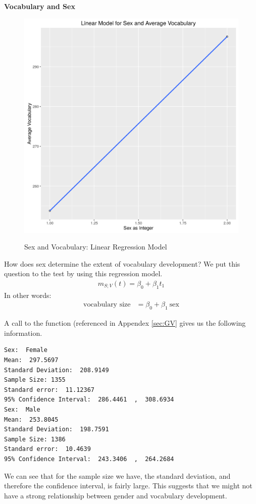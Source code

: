 \documentclass[11pt]{article}  %
\begin{document}
\textbf{Vocabulary and Sex}
\begin{figure}[h]
\centering
\caption{Sex and Vocabulary: Linear Regression Model}
\includegraphics[scale=.50]{means_sex}
\label{sexV}
\end{figure}

How does sex determine the extent of vocabulary development? We put this question to the test by using this regression model.
    \begin{align*}
        m_{S;V}(t) = \beta_0 + \beta_1 t_1
    \end{align*}
    In other words:
    \begin{align*}
        \text{vocabulary size} &= \beta_0 + \beta_1\ \text{sex}
    \end{align*}

\indent A call to the function (referenced in Appendex \ref{sec:GV} gives us the following information.
\begin{lstlisting}
Sex:  Female 
Mean:  297.5697 
Standard Deviation:  208.9149 
Sample Size: 1355 
Standard error:  11.12367 
95% Confidence Interval:  286.4461  ,  308.6934 
Sex:  Male 
Mean:  253.8045 
Standard Deviation:  198.7591 
Sample Size: 1386 
Standard error:  10.4639 
95% Confidence Interval:  243.3406  ,  264.2684 
\end{lstlisting}
We can see that for the sample size we have, the standard deviation, and therefore the confidence interval, is fairly large. This suggests that we might not have a strong relationship between gender and vocabulary development.
\end{document}
